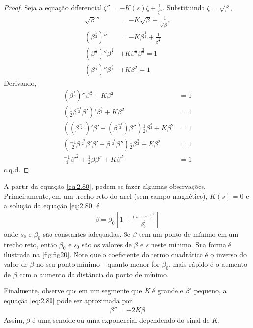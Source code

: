 \begin{proof}
	Seja a equação diferencial $\zeta'' = -K(s)\zeta + \frac{1}{\zeta^3}$. Substituindo $\zeta = \sqrt{\beta}$,
	\begin{align*}
		\sqrt{\beta}'' &= -K\sqrt{\beta} + \frac{1}{\sqrt{\beta}^3}\\
		\left(\beta^\frac{1}{2}\right)'' &= -K\beta^\frac{1}{2} + \frac{1}{\beta^\frac{3}{2}}\\
		\left(\beta^\frac{1}{2}\right)''\beta^\frac{3}{2} &+ K\beta^\frac{1}{2} \beta^\frac{3}{2} = 1\\
		\left(\beta^\frac{1}{2}\right)''\beta^\frac{3}{2} &+ K\beta^2 = 1
	\end{align*}
	Derivando,
	\begin{align*}
		\left(\beta^\frac{1}{2}\right)''\beta^\frac{3}{2} + K\beta^2 &= 1\\
		\left(\frac{1}{2}\beta^\frac{-1}{2}\beta'\right)'\beta^\frac{3}{2} + K\beta^2 &= 1\\
		\left(\left(\beta^\frac{-1}{2}\right)'\beta' + \left(\beta^\frac{-1}{2}\right)\beta''\right)\frac{1}{2}\beta^\frac{3}{2} + K\beta^2 &= 1\\
		\left(\frac{-1}{2}\beta^\frac{-3}{2}\beta'\beta' + \beta^\frac{-1}{2}\beta''\right)\frac{1}{2}\beta^\frac{3}{2} + K\beta^2 &= 1\\
		\frac{-1}{4}\beta'^2 + \frac{1}{2}\beta\beta'' + K\beta^2 &= 1
	\end{align*}
	c.q.d.
\end{proof}

A partir da equação \eqref{eq:2.80}, podem-se fazer algumas observações. Primeiramente, em um trecho reto do anel (sem campo magnético), $K(s)=0$ e a solução da equação \eqref{eq:2.80} é
\begin{align}
	\beta = \beta_0\left[1+\frac{(s-s_0)^2}{\beta_0^2}\right]
\end{align}
onde $s_0$ e $\beta_0$ são constantes adequadas. Se $\beta$ tem um ponto de mínimo em um trecho reto, então $\beta_0$ e $s_0$ são os valores de $\beta$ e $s$ neste mínimo. Sua forma é ilustrada na \autoref{fig:fig20}. Note que o coeficiente do termo quadrático é o inverso do valor de $\beta$ no seu ponto mínimo -- quanto menor for $\beta_0$. mais rápido é o aumento de $\beta$ com o aumento da distância do ponto de mínimo.

Finalmente, observe que em um segmente que $K$ é grande e $\beta'$ pequeno, a equação \eqref{eq:2.80} pode ser aproximada por
\begin{align}
	\beta'' = -2K\beta
\end{align}
Assim, $\beta$ é uma senoide ou uma exponencial dependendo do sinal de $K$.

